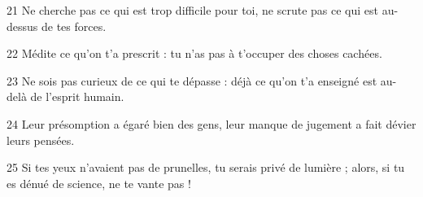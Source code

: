 21 Ne cherche pas ce qui est trop difficile pour toi, ne scrute pas ce qui est au-dessus de tes forces.

22 Médite ce qu’on t’a prescrit : tu n’as pas à t’occuper des choses cachées.

23 Ne sois pas curieux de ce qui te dépasse : déjà ce qu’on t’a enseigné est au-delà de l’esprit humain.

24 Leur présomption a égaré bien des gens, leur manque de jugement a fait dévier leurs pensées.

25 Si tes yeux n’avaient pas de prunelles, tu serais privé de lumière ; alors, si tu es dénué de science, ne te vante pas !
